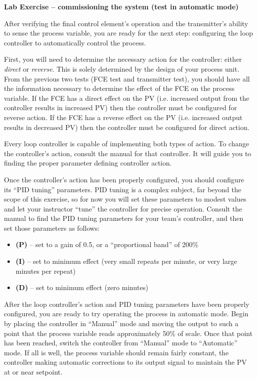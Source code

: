\vfil \eject

\noindent
{\bf Lab Exercise -- commissioning the system (test in automatic mode)}

\vskip 5pt

After verifying the final control element's operation and the transmitter's ability to sense the process variable, you are ready for the next step: configuring the loop controller to automatically control the process.  

First, you will need to determine the necessary action for the controller: either {\it direct} or {\it reverse}.  This is solely determined by the design of your process unit.  From the previous two tests (FCE test and transmitter test), you should have all the information necessary to determine the effect of the FCE on the process variable.  If the FCE has a direct effect on the PV (i.e. increased output from the controller results in increased PV) then the controller must be configured for reverse action.  If the FCE has a reverse effect on the PV (i.e. increased output results in decreased PV) then the controller must be configured for direct action.

Every loop controller is capable of implementing both types of action.  To change the controller's action, consult the manual for that controller.  It will guide you to finding the proper parameter defining controller action.

Once the controller's action has been properly configured, you should configure its ``PID tuning'' parameters.  PID tuning is a complex subject, far beyond the scope of this exercise, so for now you will set these parameters to modest values and let your instructor ``tune'' the controller for precise operation.  Consult the manual to find the PID tuning parameters for your team's controller, and then set those parameters as follows:

\begin{itemize}
\item{} {\bf (P)} -- set to a gain of 0.5, or a ``proportional band'' of 200\%
\item{} {\bf (I)} -- set to minimum effect (very small repeats per minute, or very large minutes per repeat)
\item{} {\bf (D)} -- set to minimum effect (zero minutes)
\end{itemize}

After the loop controller's action and PID tuning parameters have been properly configured, you are ready to try operating the process in automatic mode.  Begin by placing the controller in ``Manual'' mode and moving the output to such a point that the process variable reads approximately 50\% of scale.  Once that point has been reached, switch the controller from ``Manual'' mode to ``Automatic'' mode.  If all is well, the process variable should remain fairly constant, the controller making automatic corrections to its output signal to maintain the PV at or near setpoint.

